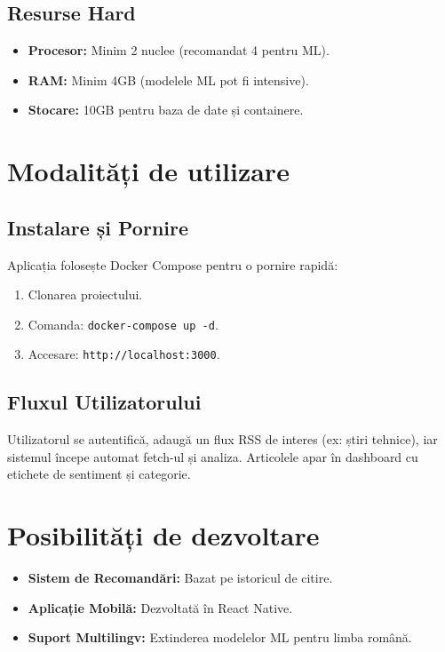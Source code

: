 \documentclass[12pt,a4paper]{article}
\begin{document}
\subsection{Resurse Hard}
\begin{itemize}
    \item \textbf{Procesor:} Minim 2 nuclee (recomandat 4 pentru ML).
    \item \textbf{RAM:} Minim 4GB (modelele ML pot fi intensive).
    \item \textbf{Stocare:} 10GB pentru baza de date și containere.
\end{itemize}

\section{Modalități de utilizare}

\subsection{Instalare și Pornire}
Aplicația folosește Docker Compose pentru o pornire rapidă:
\begin{enumerate}
    \item Clonarea proiectului.
    \item Comanda: \texttt{docker-compose up -d}.
    \item Accesare: \texttt{http://localhost:3000}.
\end{enumerate}

\subsection{Fluxul Utilizatorului}
Utilizatorul se autentifică, adaugă un flux RSS de interes (ex: știri tehnice), iar sistemul începe automat fetch-ul și analiza. Articolele apar în dashboard cu etichete de sentiment și categorie.

\section{Posibilități de dezvoltare}

\begin{itemize}
    \item \textbf{Sistem de Recomandări:} Bazat pe istoricul de citire.
    \item \textbf{Aplicație Mobilă:} Dezvoltată în React Native.
    \item \textbf{Suport Multilingv:} Extinderea modelelor ML pentru limba română.
\end{itemize}
\end{document}
